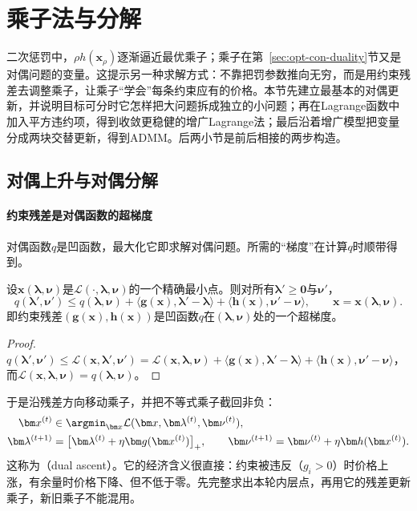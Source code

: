 \section{乘子法与分解}
\label{sec:opt-con-multipliers}

二次惩罚中，$\rho h(\bm x_\rho)$逐渐逼近最优乘子；乘子在第~\ref{sec:opt-con-duality}节又是对偶问题的变量。这提示另一种求解方式：不靠把罚参数推向无穷，而是用约束残差去调整乘子，让乘子“学会”每条约束应有的价格。本节先建立最基本的对偶更新，并说明目标可分时它怎样把大问题拆成独立的小问题；再在Lagrange函数中加入平方违约项，得到收敛更稳健的增广Lagrange法；最后沿着增广模型把变量分成两块交替更新，得到ADMM。后两小节是前后相接的两步构造。

\subsection{对偶上升与对偶分解}
\label{sec:opt-con-dual-ascent}

\paragraph{约束残差是对偶函数的超梯度}
对偶函数$q$是凹函数，最大化它即求解对偶问题。所需的“梯度”在计算$q$时顺带得到。

\begin{theorem}[残差给出超梯度]
\label{thm:opt-con-dual-supergradient}
设$\bm x(\bm\lambda,\bm\nu)$是$\mathcal L(\cdot,\bm\lambda,\bm\nu)$的一个精确最小点。则对所有$\bm\lambda'\geq\bm0$与$\bm\nu'$，
\[
  q(\bm\lambda',\bm\nu')\leq q(\bm\lambda,\bm\nu)+\langle\bm g(\bm x),\bm\lambda'-\bm\lambda\rangle+\langle\bm h(\bm x),\bm\nu'-\bm\nu\rangle,\qquad\bm x=\bm x(\bm\lambda,\bm\nu).
\]
即约束残差$(\bm g(\bm x),\bm h(\bm x))$是凹函数$q$在$(\bm\lambda,\bm\nu)$处的一个超梯度。
\end{theorem}

\begin{proof}
$q(\bm\lambda',\bm\nu')\leq\mathcal L(\bm x,\bm\lambda',\bm\nu')=\mathcal L(\bm x,\bm\lambda,\bm\nu)+\langle\bm g(\bm x),\bm\lambda'-\bm\lambda\rangle+\langle\bm h(\bm x),\bm\nu'-\bm\nu\rangle$，而$\mathcal L(\bm x,\bm\lambda,\bm\nu)=q(\bm\lambda,\bm\nu)$。
\end{proof}

于是沿残差方向移动乘子，并把不等式乘子截回非负：
\begin{equation}
\label{eq:opt-con-dual-ascent}
  \begin{aligned}
    \bm x^{(t)}&\in\argmin_{\bm x}\mathcal L(\bm x,\bm\lambda^{(t)},\bm\nu^{(t)}),\\
    \bm\lambda^{(t+1)}&=\bigl[\bm\lambda^{(t)}+\eta\bm g(\bm x^{(t)})\bigr]_+,\qquad
    \bm\nu^{(t+1)}=\bm\nu^{(t)}+\eta\bm h(\bm x^{(t)}).
  \end{aligned}
\end{equation}
这称为（dual ascent）。它的经济含义很直接：约束被违反（$g_i>0$）时价格上涨，有余量时价格下降、但不低于零。先完整求出本轮内层点，再用它的残差更新乘子，新旧乘子不能混用。


